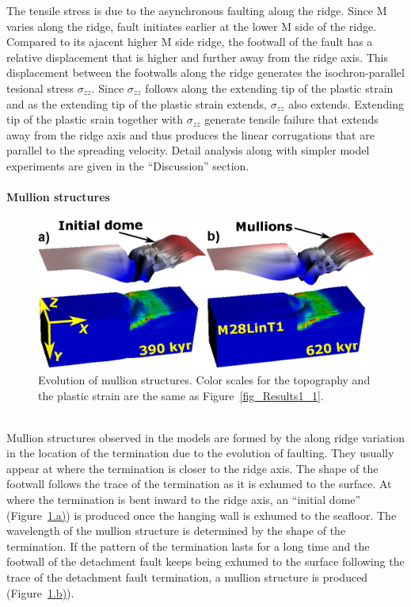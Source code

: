 The tensile stress is due to the asynchronous faulting along the ridge. Since M varies along the ridge, fault initiates earlier at the lower M side of the ridge. Compared to its ajacent higher M side ridge, the footwall of the fault has a relative displacement that is higher and further away from the ridge axis. This displacement between the footwalls along the ridge generates the isochron-parallel tesional stress $\sigma_{zz}$. Since $\sigma_{zz}$ follows along the extending tip of the plastic strain and as the extending tip of the plastic strain extends, $\sigma_{zz}$ also extends. Extending tip of the plastic srain together with $\sigma_{zz}$ generate tensile failure that extends away from the ridge axis and thus produces the linear corrugations that are parallel to the spreading velocity. Detail analysis along with simpler model experiments are given in the ``Discussion'' section.   

\paragraph{Mullion structures}

\begin{figure}[h]
  \centering
    \includegraphics[width=1.0\textwidth]{./Figures/fig_Results_3_2_6_mullion_evolution.eps}
  \caption{Evolution of mullion structures. Color scales for the topography and the plastic strain are the same as Figure~\hyperref[fig_Results1_1]{\ref{fig_Results1_1}}.}
 \label{fig_Results_3_2_6_mullion_evolution}
\end{figure}
~\\
Mullion structures observed in the models are formed by the along ridge variation in the location of the termination due to the evolution of faulting. They usually appear at where the termination is closer to the ridge axis. The shape of the footwall follows the trace of the termination as it is exhumed to the surface. At where the termination is bent inward to the ridge axis, an ``initial dome'' (Figure~\hyperref[fig_Results_3_2_6_mullion_evolution]{\ref{fig_Results_3_2_6_mullion_evolution}.a)}) is produced once the hanging wall is exhumed to the seafloor. The wavelength of the mullion structure is determined by the shape of the termination. If the pattern of the termination lasts for a long time and the footwall of the detachment fault keeps being exhumed to the surface following the trace of the detachment fault termination, a mullion structure is produced (Figure~\hyperref[fig_Results_3_2_6_mullion_evolution]{\ref{fig_Results_3_2_6_mullion_evolution}.b)}). 


